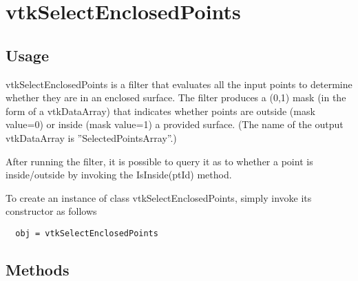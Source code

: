 \section{vtkSelectEnclosedPoints}

\subsection{Usage}

 vtkSelectEnclosedPoints is a filter that evaluates all the input points to
 determine whether they are in an enclosed surface. The filter produces a
 (0,1) mask (in the form of a vtkDataArray) that indicates whether points 
 are outside (mask value=0) or inside (mask value=1) a provided surface.
 (The name of the output vtkDataArray is ''SelectedPointsArray''.)

 After running the filter, it is possible to query it as to whether a point 
 is inside/outside by invoking the IsInside(ptId) method.

To create an instance of class vtkSelectEnclosedPoints, simply
invoke its constructor as follows
\begin{verbatim}
  obj = vtkSelectEnclosedPoints
\end{verbatim}
\subsection{Methods}

